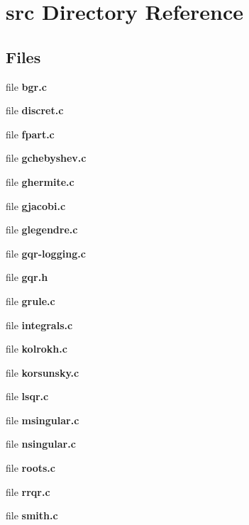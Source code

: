 \section{src Directory Reference}
\label{dir_68267d1309a1af8e8297ef4c3efbcdba}
\subsection*{Files}
\begin{DoxyCompactItemize}
\item 
file {\bfseries bgr.\+c}
\item 
file {\bfseries discret.\+c}
\item 
file {\bfseries fpart.\+c}
\item 
file {\bfseries gchebyshev.\+c}
\item 
file {\bfseries ghermite.\+c}
\item 
file {\bfseries gjacobi.\+c}
\item 
file {\bfseries glegendre.\+c}
\item 
file {\bfseries gqr-\/logging.\+c}
\item 
file {\bfseries gqr.\+h}
\item 
file {\bfseries grule.\+c}
\item 
file {\bfseries integrals.\+c}
\item 
file {\bfseries kolrokh.\+c}
\item 
file {\bfseries korsunsky.\+c}
\item 
file {\bfseries lsqr.\+c}
\item 
file {\bfseries msingular.\+c}
\item 
file {\bfseries nsingular.\+c}
\item 
file {\bfseries roots.\+c}
\item 
file {\bfseries rrqr.\+c}
\item 
file {\bfseries smith.\+c}
\end{DoxyCompactItemize}
